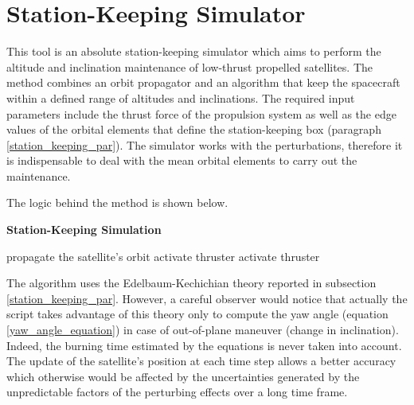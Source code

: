 \section{Station-Keeping Simulator} \label{sk_simulator_par}
This tool is an absolute station-keeping simulator which aims to perform the altitude and inclination maintenance of low-thrust propelled satellites.
The method combines an orbit propagator and an algorithm that keep the spacecraft within a defined range of altitudes and inclinations.
The required input parameters include the thrust force of the propulsion system as well as the edge values of the orbital elements that define the station-keeping box (paragraph \ref{station_keeping_par}).
The simulator works with the perturbations, therefore it is indispensable to deal with the mean orbital elements to carry out the maintenance.

The logic behind the method is shown below.
\begin{algorithm}[H]
      \caption{\textbf{Station-Keeping Simulation}}
      \begin{algorithmic}[1]
                        \State propagate the satellite's orbit
                                \State activate thruster
                            \EndWhile
                        \EndIf           
                                \State activate thruster
                            \EndWhile
                    \EndIf
                  \EndFor
            \EndProcedure
      \end{algorithmic}
\end{algorithm}

The algorithm uses the Edelbaum-Kechichian theory reported in subsection \ref{station_keeping_par}.
However, a careful observer would notice that actually the script takes advantage of this theory only to compute the yaw angle (equation \ref{yaw_angle_equation}) in case of out-of-plane maneuver (change in inclination).
Indeed, the burning time estimated by the equations is never taken into account.
The update of the satellite's position at each time step allows a better accuracy which otherwise would be affected by the uncertainties generated by the unpredictable factors of the perturbing effects over a long time frame.

